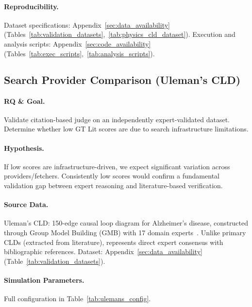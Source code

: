 \paragraph{Reproducibility.}
Dataset specifications: Appendix~\ref{sec:data_availability} (Tables~\ref{tab:validation_datasets},~\ref{tab:physics_cld_dataset}). Execution and analysis scripts: Appendix~\ref{sec:code_availability} (Tables~\ref{tab:exec_scripts},~\ref{tab:analysis_scripts}).

\subsection{Search Provider Comparison (Uleman's CLD)}
\label{sec:ulemans_validation}

\paragraph{RQ \& Goal.}
Validate citation-based judge on an independently expert-validated dataset. Determine whether low GT Lit scores are due to search infrastructure limitations.

\paragraph{Hypothesis.}
If low scores are infrastructure-driven, we expect significant variation across providers/fetchers. Consistently low scores would confirm a fundamental validation gap between expert reasoning and literature-based verification.

\paragraph{Source Data.}
Uleman's CLD: 150-edge causal loop diagram for Alzheimer's disease, constructed through Group Model Building (GMB) with 17 domain experts~\cite{uleman2024triangulation}. Unlike primary CLDs (extracted from literature), represents direct expert consensus with bibliographic references. Dataset: Appendix~\ref{sec:data_availability} (Table~\ref{tab:validation_datasets}).

\paragraph{Simulation Parameters.}
Full configuration in Table~\ref{tab:ulemans_config}.

